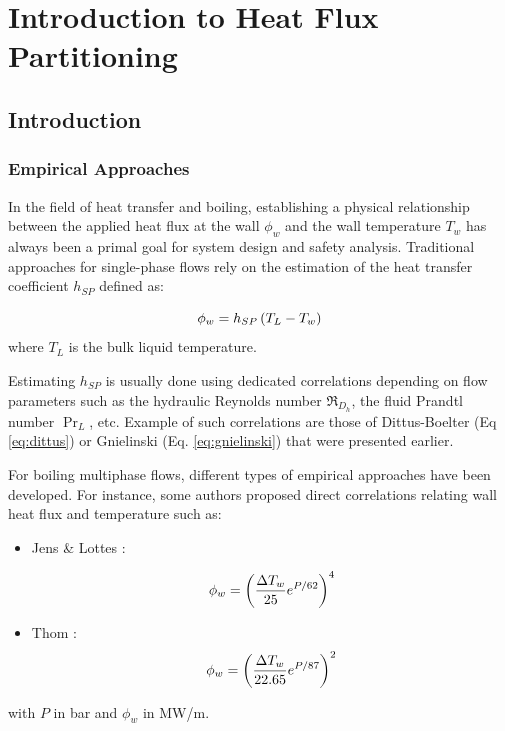 
\chapter{Introduction to Heat Flux Partitioning} %

\label{chap:HFP_bib} %

\minitoc

\section{Introduction}

\subsection{Empirical Approaches}

In the field of heat transfer and boiling, establishing a physical relationship between the applied heat flux at the wall $\phi_{w}$ and the wall temperature $T_{w}$ has always been a primal goal for system design and safety analysis. Traditional approaches for single-phase flows rely on the estimation of the heat transfer coefficient $h_{SP}$ defined as:

\begin{equation}
\phi_{w} = h_{SP} \left( T_{L} - T_{w} \right)
\end{equation}
where $T_{L}$ is the bulk liquid temperature. 

Estimating $h_{SP}$ is usually done using dedicated correlations depending on flow parameters such as the hydraulic Reynolds number $\Re_{D_{h}}$, the fluid Prandtl number $\Pr_{L}$, etc. Example of such correlations are those of Dittus-Boelter (Eq \ref{eq:dittus}) or Gnielinski (Eq. \ref{eq:gnielinski}) that were presented earlier.

\npar

For boiling multiphase flows, different types of empirical approaches have been developed. For instance, some authors proposed direct correlations relating wall heat flux and temperature such as:

\begin{itemize}
\item Jens \& Lottes \cite{jens_analysis_1951}:

\begin{equation}
\phi_{w} = \left(  \frac{\Delta T_{w} }{25} e^{P / 62}	 \right)^{4}
\label{eq:jens_correl}
\end{equation}

\item Thom \etal \cite{thom_phiw}:
\begin{equation}
\phi_{w} = \left(  \frac{\Delta T_{w} }{22.65} e^{P / 87}	 \right)^{2}
\label{eq:thom_correl}
\end{equation}
\end{itemize}
with $P$ in bar and $\phi_{w}$ in MW/m.

